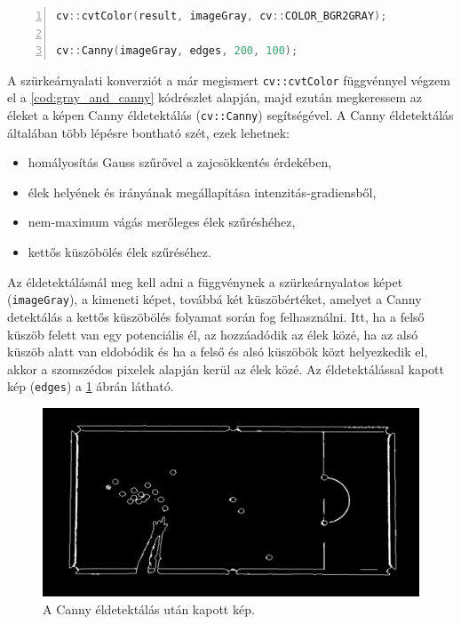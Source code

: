\vspace{2mm}
\hspace{-10mm}
\begin{minipage}{\linewidth}
\begin{lstlisting}[language=C++, numbers=left, caption={Szürkeárnyalatolás és éldetektálás.}, label={cod:gray_and_canny}]
cv::cvtColor(result, imageGray, cv::COLOR_BGR2GRAY);

cv::Canny(imageGray, edges, 200, 100);
\end{lstlisting}
\end{minipage}

\par A szürkeárnyalati konverziót a már megismert \lstinline{cv::cvtColor} függvénnyel \cite{opencv_docs} végzem el a \ref{cod:gray_and_canny} kódrészlet alapján, majd ezután megkeressem az éleket a képen Canny éldetektálás \cite{opencv_docs, canny_edge_detection} (\lstinline{cv::Canny}) segítségével.
\newline A Canny éldetektálás általában több lépésre bontható szét, ezek lehetnek:

\begin{itemize}
    \setlength\itemsep{-2pt}
    \item homályosítás Gauss szűrővel \cite{shapiro2001} a zajcsökkentés érdekében,
    \item élek helyének és irányának megállapítása intenzitás-gradiensből,
    \item nem-maximum vágás merőleges élek szűréshéhez,
    \item kettős küszöbölés élek szűréséhez.
\end{itemize}

\par Az éldetektálásnál meg kell adni a függvénynek a szürkeárnyalatos képet (\lstinline{imageGray}), a kimeneti képet, továbbá két küszöbértéket, amelyet a Canny detektálás a kettős küszöbölés folyamat során fog felhasználni. Itt, ha a felső küszöb felett van egy potenciális él, az hozzáadódik az élek közé, ha az alsó küszöb alatt van eldobódik és ha a felső és alsó küszöbök közt helyezkedik el, akkor a szomszédos pixelek alapján kerül az élek közé. Az éldetektálással kapott kép (\lstinline{edges}) a \ref{fig:bemeneti_kep_edge} ábrán látható.

\begin{figure}[!ht]
    \centering
    \includegraphics[width=140mm, keepaspectratio]{figures/input_screen_edge.png}
    \caption{A Canny éldetektálás után kapott kép.}
    \label{fig:bemeneti_kep_edge}
\end{figure}

